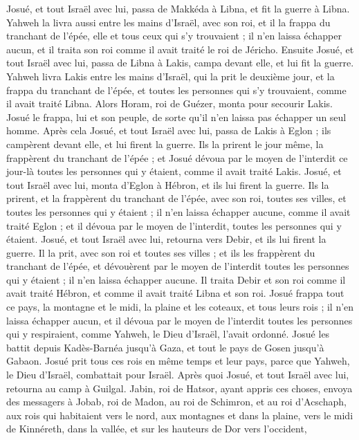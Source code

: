 \begin{multicols}{2}
Josué, et tout Israël avec lui, passa de Makkéda à Libna, et fit la guerre à Libna.
Yahweh la livra aussi entre les mains d’Israël, avec son roi, et il la frappa du tranchant de l’épée, elle et tous ceux qui s’y trouvaient ; il n’en laissa échapper aucun, et il traita son roi comme il avait traité le roi de Jéricho.
Ensuite Josué, et tout Israël avec lui, passa de Libna à Lakis, campa devant elle, et lui fit la guerre.
Yahweh livra Lakis entre les mains d’Israël, qui la prit le deuxième jour, et la frappa du tranchant de l’épée, et toutes les personnes qui s’y trouvaient, comme il avait traité Libna.
Alors Horam, roi de Guézer, monta pour secourir Lakis. Josué le frappa, lui et son peuple, de sorte qu’il n’en laissa pas échapper un seul homme.
Après cela Josué, et tout Israël avec lui, passa de Lakis à Eglon ; ils campèrent devant elle, et lui firent la guerre.
Ils la prirent le jour même, la frappèrent du tranchant de l’épée ; et Josué dévoua par le moyen de l'interdit ce jour-là toutes les personnes qui y étaient, comme il avait traité Lakis.
Josué, et tout Israël avec lui, monta d’Eglon à Hébron, et ils lui firent la guerre.
Ils la prirent, et la frappèrent du tranchant de l’épée, avec son roi, toutes ses villes, et toutes les personnes qui y étaient ; il n’en laissa échapper aucune, comme il avait traité Eglon ; et il dévoua par le moyen de l'interdit, toutes les personnes qui y étaient.
Josué, et tout Israël avec lui, retourna vers Debir, et ils lui firent la guerre.
Il la prit, avec son roi et toutes ses villes ; et ils les frappèrent du tranchant de l’épée, et dévouèrent par le moyen de l'interdit toutes les personnes qui y étaient ; il n’en laissa échapper aucune. Il traita Debir et son roi comme il avait traité Hébron, et comme il avait traité Libna et son roi.
Josué frappa tout ce pays, la montagne et le midi, la plaine et les coteaux, et tous leurs rois ; il n’en laissa échapper aucun, et il dévoua par le moyen de l'interdit toutes les personnes qui y respiraient, comme Yahweh, le Dieu d’Israël, l’avait ordonné.
Josué les battit depuis Kadès-Barnéa jusqu’à Gaza, et tout le pays de Gosen jusqu’à Gabaon.
Josué prit tous ces rois en même temps et leur pays, parce que Yahweh, le Dieu d’Israël, combattait pour Israël.
Après quoi Josué, et tout Israël avec lui, retourna au camp à Guilgal.
\VerseOne{}Jabin, roi de Hatsor, ayant appris ces choses, envoya des messagers à Jobab, roi de Madon, au roi de Schimron, et au roi d’Acschaph,
aux rois qui habitaient vers le nord, aux montagnes et dans la plaine, vers le midi de Kinnéreth, dans la vallée, et sur les hauteurs de Dor vers l’occident,

\end{multicols}
